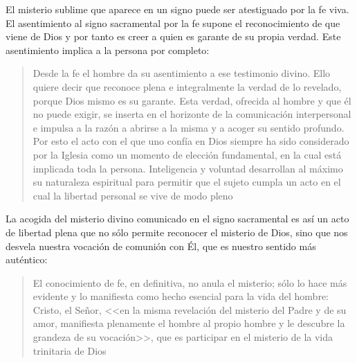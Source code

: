 El misterio sublime que aparece en un signo puede ser atestiguado por la fe viva. El asentimiento al signo sacramental por la fe supone el reconocimiento de que viene de Dios y por tanto es creer a quien es garante de su propia verdad. Este asentimiento implica a la persona por completo: \blockquote[][\,(ibíd.)]{Desde la fe el hombre da su asentimiento a ese testimonio divino. Ello quiere decir que reconoce plena e integralmente la verdad de lo revelado, porque Dios mismo es su garante. Esta verdad, ofrecida al hombre y que él no puede exigir, se inserta en el horizonte de la comunicación interpersonal e impulsa a la razón a abrirse a la misma y a acoger su sentido profundo. Por esto el acto con el que uno confía en Dios siempre ha sido considerado por la Iglesia como un momento de elección fundamental, en la cual está implicada toda la persona. Inteligencia y voluntad desarrollan al máximo su naturaleza espiritual para permitir que el sujeto cumpla un acto en el cual la libertad personal se vive de modo pleno}. La acogida del misterio divino comunicado en el signo sacramental es así un acto de libertad plena que no sólo permite reconocer el misterio de Dios, sino que nos desvela nuestra vocación de comunión con Él, que es nuestro sentido más auténtico: \blockquote[][\,(ibíd.)]{El conocimiento de fe, en definitiva, no anula el misterio; sólo lo hace más evidente y lo manifiesta como hecho esencial para la vida del hombre: Cristo, el Señor, <<en la misma revelación del misterio del Padre y de su amor, manifiesta plenamente el hombre al propio hombre y le descubre la grandeza de su vocación>>, que es participar en el misterio de la vida trinitaria de Dios}.

